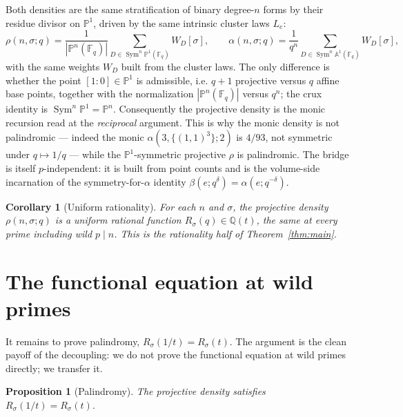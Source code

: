 \documentclass[pdflatex,sn-mathphys-num]{sn-jnl}%
\DeclareMathOperator{\Sym}{Sym}
\newcommand{\bbF}{\mathbb{F}}
\newcommand{\bbQ}{\mathbb{Q}}
\newcommand{\bbP}{\mathbb{P}}
\theoremstyle{plain}
\newtheorem{proposition}[theorem]{Proposition}
\newtheorem{corollary}[theorem]{Corollary}
\theoremstyle{definition}
\theoremstyle{remark}
\numberwithin{equation}{section}
\begin{document}
Both densities are the same stratification of binary degree-$n$ forms by their
residue divisor on $\bbP^{1}$, driven by the same intrinsic cluster laws
$L_{e}$:
\[
  \rho(n,\sigma;q)=\frac{1}{|\bbP^{n}(\bbF_{q})|}\sum_{D\in\Sym^{n}\bbP^{1}(\bbF_{q})}W_{D}[\sigma],
  \qquad
  \alpha(n,\sigma;q)=\frac{1}{q^{n}}\sum_{D\in\Sym^{n}\mathbb{A}^{1}(\bbF_{q})}W_{D}[\sigma],
\]
with the same weights $W_{D}$ built from the cluster laws. The only difference is
whether the point $[1:0]\in\bbP^{1}$ is admissible, i.e. $q+1$ projective versus
$q$ affine base points, together with the normalization $|\bbP^{n}(\bbF_{q})|$
versus $q^{n}$; the crux identity is $\Sym^{n}\bbP^{1}=\bbP^{n}$. Consequently the
projective density is the monic recursion read at the \emph{reciprocal} argument.
This is why the monic density is not palindromic --- indeed the monic
$\alpha(3,\{(1,1)^{3}\};2)$ is $4/93$, not symmetric under $q\mapsto1/q$ --- while
the $\bbP^{1}$-symmetric projective $\rho$ is palindromic. The bridge is itself
$p$-independent: it is built from point counts and is the volume-side incarnation
of the symmetry-for-$\alpha$ identity $\beta(e;q^{\delta})=\alpha(e;q^{-\delta})$.

\begin{corollary}[Uniform rationality]\label{cor:rationality}
For each $n$ and $\sigma$, the projective
density $\rho(n,\sigma;q)$ is a uniform rational function $R_{\sigma}(q)\in\bbQ(t)$,
the same at every prime including wild $p\mid n$. This is the rationality half of
Theorem~\textup{\ref{thm:main}}.
\end{corollary}

\section{The functional equation at wild primes}\label{sec:wild-symmetry}

It remains to prove palindromy, $R_{\sigma}(1/t)=R_{\sigma}(t)$. The argument is
the clean payoff of the decoupling: we do not prove the functional equation at
wild primes directly; we transfer it.

\begin{proposition}[Palindromy]\label{prop:palindromy}
The projective density satisfies $R_{\sigma}(1/t)=R_{\sigma}(t)$.
\end{proposition}
\end{document}
